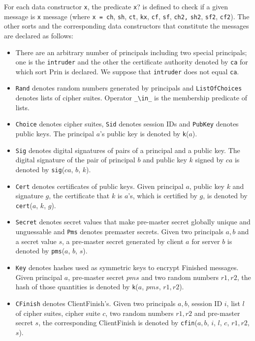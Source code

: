 \documentclass[a4paper,fleqn]{cas-dc}
\begin{document}
For each data constructor \verb!x!, the predicate \verb!x!? is defined to check if a given message is \verb!x! message (where \verb!x = ch!, \verb!sh!, \verb!ct!, \verb!kx!, \verb!cf!, \verb!sf!, \verb!ch2,! \verb!sh2!, \verb!sf2!, \verb!cf2!).
The other sorts and the corresponding data
constructors that constitute the messages are declared as follows:
\begin{itemize}
  \item There are an arbitrary number of principals including two special principals; one is the \verb!intruder! and the other the certificate authority denoted by \verb!ca! for which sort Prin is declared. We suppose that \verb!intruder! does not equal \verb!ca!. 
  \item \verb!Rand! denotes random numbers generated by principals and
\verb!ListOfChoices! denotes lists of cipher suites. Operator \verb|_\in_| is the membership predicate of lists.
  \item \verb!Choice! denotes cipher suites, \verb!Sid! denotes session IDs and \verb!PubKey! denotes public keys. The principal $a$’s public key is denoted by \verb!k!($a$).
\item \verb!Sig! denotes digital signatures of pairs of a principal and a public key. The digital signature of the pair of principal $b$ and public key $k$ signed by $ca$ is denoted by \verb!sig!($ca$, $b$, $k$).
\item \verb!Cert! denotes certificates of public keys. Given principal $a$, public key $k$ and signature $g$, the certificate that $k$ is $a$’s, which is certified by $g$, is denoted by \verb!cert!($a$, $k$, $g$).
\item \verb!Secret! denotes secret values that make pre-master secret globally unique and unguessable and \verb!Pms! denotes premaster secrets. Given two principals $a,b$ and a secret value $s$, a pre-master secret generated by client $a$ for server $b$ is denoted by \verb!pms!($a$, $b$, $s$).
\item \verb!Key! denotes hashes used as symmetric keys to encrypt Finished messages. Given principal $a$, pre-master secret $pms$ and two random numbers $r1,r2$, the hash of those quantities is denoted by \verb!k!($a$, $pms$, $r1, r2$).
\item \verb!CFinish! denotes ClientFinish’s. Given two principals $a, b$, session ID $i$, list $l$ of cipher suites, cipher suite $c$, two random numbers $r1, r2$ and pre-master secret $s$, the corresponding ClientFinish is denoted by \verb!cfin!($a, b$, $i$, $l$, $c$, $r1, r2$, $s$).

\end{itemize}
\end{document}
